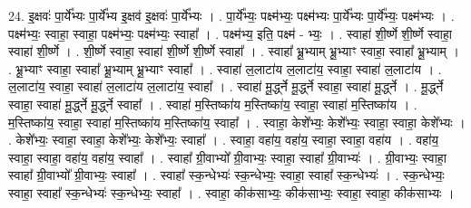 \documentclass[17pt]{extarticle}
\begin{document}
24. इ॒क्षवः॑ पा॒र्ये᳚भ्यः पा॒र्ये᳚भ्य इ॒क्षव॑ इ॒क्षवः॑ पा॒र्ये᳚भ्यः । . पा॒र्ये᳚भ्यः॒ पक्ष्म॑भ्यः॒ पक्ष्म॑भ्यः पा॒र्ये᳚भ्यः पा॒र्ये᳚भ्यः॒ पक्ष्म॑भ्यः । . पक्ष्म॑भ्यः॒ स्वाहा॒ स्वाहा॒ पक्ष्म॑भ्यः॒ पक्ष्म॑भ्यः॒ स्वाहा᳚ । . पक्ष्म॑भ्य॒ इति॒ पक्ष्म॑ - भ्यः॒ । . स्वाहा॑ शी॒र्ष्णे शी॒र्ष्णे स्वाहा॒ स्वाहा॑ शी॒र्ष्णे । . शी॒र्ष्णे स्वाहा॒ स्वाहा॑ शी॒र्ष्णे शी॒र्ष्णे स्वाहा᳚ । . स्वाहा᳚ भ्रू॒भ्याम् भ्रू॒भ्याꣳ स्वाहा॒ स्वाहा᳚ भ्रू॒भ्याम् । . भ्रू॒भ्याꣳ स्वाहा॒ स्वाहा᳚ भ्रू॒भ्याम् भ्रू॒भ्याꣳ स्वाहा᳚ । . स्वाहा॑ ल॒लाटा॑य ल॒लाटा॑य॒ स्वाहा॒ स्वाहा॑ ल॒लाटा॑य । . ल॒लाटा॑य॒ स्वाहा॒ स्वाहा॑ ल॒लाटा॑य ल॒लाटा॑य॒ स्वाहा᳚ । . स्वाहा॑ मू॒र्द्ध्ने मू॒र्द्ध्ने स्वाहा॒ स्वाहा॑ मू॒र्द्ध्ने । . मू॒र्द्ध्ने स्वाहा॒ स्वाहा॑ मू॒र्द्ध्ने मू॒र्द्ध्ने स्वाहा᳚ । . स्वाहा॑ म॒स्तिष्का॑य म॒स्तिष्का॑य॒ स्वाहा॒ स्वाहा॑ म॒स्तिष्का॑य । . म॒स्तिष्का॑य॒ स्वाहा॒ स्वाहा॑ म॒स्तिष्का॑य म॒स्तिष्का॑य॒ स्वाहा᳚ । . स्वाहा॒ केशे᳚भ्यः॒ केशे᳚भ्यः॒ स्वाहा॒ स्वाहा॒ केशे᳚भ्यः । . केशे᳚भ्यः॒ स्वाहा॒ स्वाहा॒ केशे᳚भ्यः॒ केशे᳚भ्यः॒ स्वाहा᳚ । . स्वाहा॒ वहा॑य॒ वहा॑य॒ स्वाहा॒ स्वाहा॒ वहा॑य । . वहा॑य॒ स्वाहा॒ स्वाहा॒ वहा॑य॒ वहा॑य॒ स्वाहा᳚ । . स्वाहा᳚ ग्री॒वाभ्यो᳚ ग्री॒वाभ्यः॒ स्वाहा॒ स्वाहा᳚ ग्री॒वाभ्यः॑ । . ग्री॒वाभ्यः॒ स्वाहा॒ स्वाहा᳚ ग्री॒वाभ्यो᳚ ग्री॒वाभ्यः॒ स्वाहा᳚ । . स्वाहा᳚ स्क॒न्धेभ्यः॑ स्क॒न्धेभ्यः॒ स्वाहा॒ स्वाहा᳚ स्क॒न्धेभ्यः॑ । . स्क॒न्धेभ्यः॒ स्वाहा॒ स्वाहा᳚ स्क॒न्धेभ्यः॑ स्क॒न्धेभ्यः॒ स्वाहा᳚ । . स्वाहा॒ कीक॑साभ्यः॒ कीक॑साभ्यः॒ स्वाहा॒ स्वाहा॒ कीक॑साभ्यः । \newline
\end{document}
